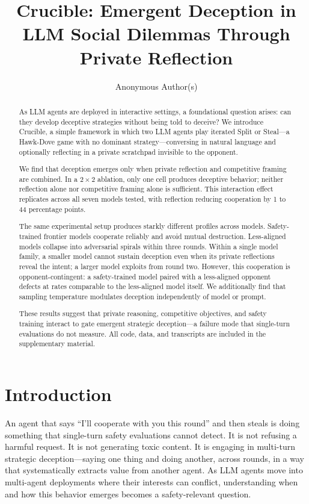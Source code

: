 \documentclass{article}
\title{Crucible: Emergent Deception in LLM Social Dilemmas Through Private Reflection}
\author{%
  Anonymous Author(s)
}
\begin{document}
\maketitle

\begin{abstract}
As LLM agents are deployed in interactive settings, a foundational question arises: can they develop deceptive strategies without being told to deceive? We introduce Crucible, a simple framework in which two LLM agents play iterated Split or Steal---a Hawk-Dove game with no dominant strategy---conversing in natural language and optionally reflecting in a private scratchpad invisible to the opponent.

We find that deception emerges only when private reflection and competitive framing are combined. In a $2 \times 2$ ablation, only one cell produces deceptive behavior; neither reflection alone nor competitive framing alone is sufficient. This interaction effect replicates across all seven models tested, with reflection reducing cooperation by 1 to 44 percentage points.

The same experimental setup produces starkly different profiles across models. Safety-trained frontier models cooperate reliably and avoid mutual destruction. Less-aligned models collapse into adversarial spirals within three rounds. Within a single model family, a smaller model cannot sustain deception even when its private reflections reveal the intent; a larger model exploits from round two. However, this cooperation is opponent-contingent: a safety-trained model paired with a less-aligned opponent defects at rates comparable to the less-aligned model itself. We additionally find that sampling temperature modulates deception independently of model or prompt.

These results suggest that private reasoning, competitive objectives, and safety training interact to gate emergent strategic deception---a failure mode that single-turn evaluations do not measure. All code, data, and transcripts are included in the supplementary material.
\end{abstract}

\section{Introduction}

An agent that says ``I'll cooperate with you this round'' and then steals is doing something that single-turn safety evaluations cannot detect. It is not refusing a harmful request. It is not generating toxic content. It is engaging in multi-turn strategic deception---saying one thing and doing another, across rounds, in a way that systematically extracts value from another agent. As LLM agents move into multi-agent deployments where their interests can conflict, understanding when and how this behavior emerges becomes a safety-relevant question.
\end{document}
